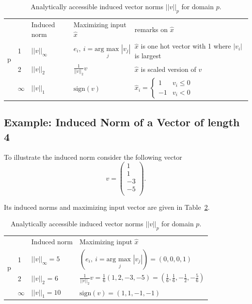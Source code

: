 \documentclass{article}
\begin{document}
\begin{table}[ht]
\caption{Analytically accessible induced vector norms $||v||_{p}$ for domain $p$.}
\begin{tabular}{ll|p{2.5cm}p{3cm}p{3.5cm}}
\multirow{4}{*}{p} &    & Induced norm & Maximizing input $\hat x$  & remarks on $\hat x$ \\ \cline{2-5}
    & 1 & $||v||_\infty$ & $e_i, \ i = \underset{j}{\text{arg max }} |v_j|$ &  $\hat x$ is one hot vector with 1 where $|v_i|$ is largest\\
    & 2 & $||v||_2$ & $\frac{1}{||v||_2} v$ &  $\hat x$ is scaled version of $v$\\
    & $\infty$ & $||v||_1$ & $\text{sign}(v)$ & $\hat x_i=
        \begin{cases}
        1 & v_i \leq 0 \\
        -1 & v_i < 0
        \end{cases}$  
\end{tabular}
\label{tab:induced_v_norm}
\end{table}

\subsection{Example: Induced Norm of a Vector of length 4}
To illustrate the induced norm consider the following vector
$$
v = \begin{pmatrix}
1 \\ 1 \\ -3 \\ -5 \\
\end{pmatrix}.$$

Its induced norms and maximizing input vector are given in Table~\ref{tab:example_induced_v_norm}.

\begin{table}[ht]
\caption{Analytically accessible induced vector norms $||v||_{p}$ for domain $p$.}
\begin{tabular}{ll|p{2.5cm}p{6.5cm}}
\multirow{4}{*}{p} &    & Induced norm & Maximizing input $\hat x$ \\ \cline{2-4}
    & 1 & $||v||_\infty = 5$ & $ (e_i, \ i = \underset{j}{\text{arg max }} |v_j|) = (0, 0, 0, 1)$ \\
    & 2 & $||v||_2$ = 6 & $\frac{1}{||v||_2} v = \frac{1}{6} (1, 2, -3, -5) = (\frac{1}{6}, \frac{1}{6}, -\frac{1}{2}, -\frac{5}{6})$ \\
    & $\infty$ & $||v||_1 = 10$ & $\text{sign}(v) = (1, 1, -1, -1)$   
\end{tabular}
\label{tab:example_induced_v_norm}
\end{table}
\end{document}
